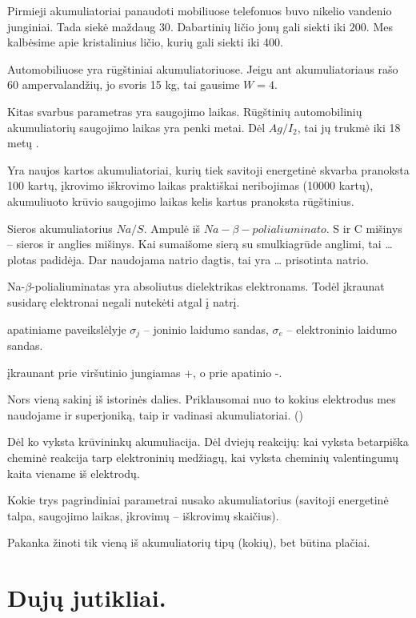 Pirmieji akumuliatoriai panaudoti mobiliuose telefonuos buvo nikelio
vandenio junginiai. Tada siekė maždaug $30$. Dabartinių ličio
jonų gali siekti iki $200$. Mes kalbėsime apie kristalinius
ličio, kurių gali siekti iki $400$.

Automobiliuose yra rūgštiniai akumuliatoriuose. Jeigu ant akumuliatoriaus
rašo 60 ampervalandžių, jo svoris 15 kg, tai gausime $W=4$.

Kitas svarbus parametras yra saugojimo laikas. Rūgštinių automobilinių
akumuliatorių saugojimo laikas yra penki metai. Dėl $Ag/I_{2}$, tai
jų trukmė iki 18 metų .

Yra naujos kartos akumuliatoriai, kurių tiek savitoji energetinė
skvarba pranoksta 100 kartų, įkrovimo iškrovimo laikas praktiškai
neribojimas (10000 kartų), akumuliuoto krūvio saugojimo laikas
kelis kartus pranoksta rūgštinius.

Sieros akumuliatorius  $Na/S$. Ampulė iš
$Na-\beta-polialiuminato$. S ir C mišinys – sieros ir anglies mišinys.
Kai sumaišome sierą su smulkiagrūde anglimi, tai … plotas padidėja.
Dar naudojama natrio dagtis, tai yra … prisotinta natrio.

Na-$\beta$-polialiuminatas yra absoliutus dielektrikas elektronams.
Todėl įkraunat susidarę elektronai negali nutekėti atgal į natrį.

 apatiniame paveikslėlyje $\sigma_{j}$ – joninio laidumo
sandas, $\sigma_{e}$ – elektroninio laidumo sandas.

 įkraunant prie viršutinio jungiamas +, o prie apatinio
-.

\begin{remember}
  \item Nors vieną sakinį iš istorinės dalies. Priklausomai nuo to
    kokius elektrodus mes naudojame ir superjoniką, taip ir vadinasi
    akumuliatoriai. ()
  \item Dėl ko vyksta krūvininkų akumuliacija. Dėl dviejų reakcijų:
    kai vyksta betarpiška cheminė reakcija tarp elektroninių medžiagų,
    kai vyksta cheminių valentingumų kaita viename iš elektrodų.
  \item Kokie trys pagrindiniai parametrai nusako akumuliatorius
    (savitoji energetinė talpa, saugojimo laikas, įkrovimų – iškrovimų
    skaičius).
  \item Pakanka žinoti tik vieną iš akumuliatorių tipų (kokių),
    bet būtina plačiai.
\end{remember}

\section{Dujų jutikliai.}

